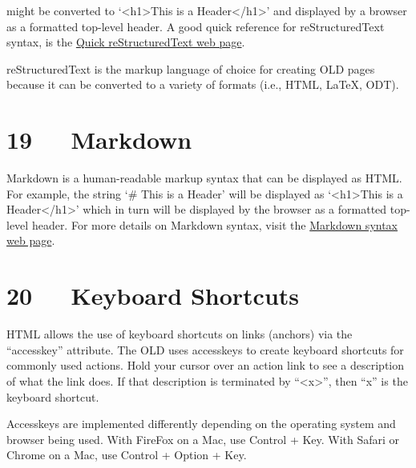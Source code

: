 \documentclass[letterpaper,10pt,english]{sphinxmanual}
\begin{document}
might be converted to `\textless{}h1\textgreater{}This is a Header\textless{}/h1\textgreater{}' and displayed by a browser as a
formatted top-level header. A good quick reference for reStructuredText syntax,
is the \href{http://docutils.sourceforge.net/docs/user/rst/quickref.html\#external-hyperlink-targets}{Quick reStructuredText web page}.

reStructuredText is the markup language of choice for creating OLD pages because
it can be converted to a variety of formats (i.e., HTML, LaTeX, ODT).


\chapter{19   Markdown}
\label{user_guide:markdown}
Markdown is a human-readable markup syntax that can be displayed as HTML.  For
example, the string `\# This is a Header' will be displayed as `\textless{}h1\textgreater{}This is a
Header\textless{}/h1\textgreater{}' which in turn will be displayed by the browser as a formatted
top-level header. For more details on Markdown syntax, visit the
\href{http://daringfireball.net/projects/markdown/syntax}{Markdown syntax web page}.


\chapter{20   Keyboard Shortcuts}
\label{user_guide:keyboard-shortcuts}
HTML allows the use of keyboard shortcuts on links (anchors) via the ``accesskey''
attribute.  The OLD uses accesskeys to create keyboard shortcuts for commonly
used actions.  Hold your cursor over an action link to see a description of what
the link does.  If that description is terminated by ``\textless{}x\textgreater{}'', then ``x'' is the
keyboard shortcut.

Accesskeys are implemented differently depending on the operating system and
browser being used.  With FireFox on a Mac, use Control + Key.  With Safari or
Chrome on a Mac, use Control + Option + Key.
\end{document}
